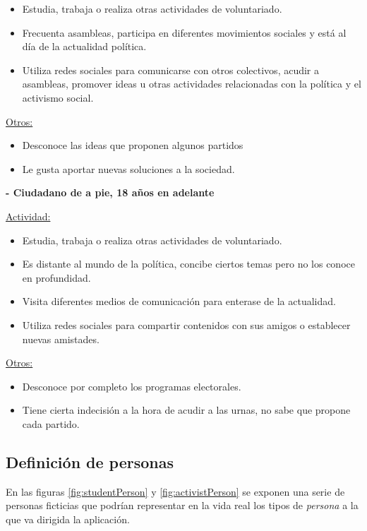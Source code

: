 \begin{itemize}
\item Estudia, trabaja o realiza otras actividades de voluntariado.
\item Frecuenta asambleas, participa en diferentes movimientos sociales y está al día de la actualidad política.
\item Utiliza redes sociales para comunicarse con otros colectivos, acudir a asambleas, promover ideas u otras actividades relacionadas con la política y el activismo social.
\end{itemize}

\underline{Otros:}

\begin{itemize}
\item Desconoce las ideas que proponen algunos partidos 
\item Le gusta aportar nuevas soluciones a la sociedad.
\end{itemize}

\textbf{- Ciudadano de a pie, 18 años en adelante}

\underline{Actividad:}

\begin{itemize}
\item Estudia, trabaja o realiza otras actividades de voluntariado.
\item Es distante al mundo de la política, concibe ciertos temas pero no los conoce en profundidad.
\item Visita diferentes medios de comunicación para enterase de la actualidad.
\item Utiliza redes sociales para compartir contenidos con sus amigos o establecer nuevas amistades.
\end{itemize}

\underline{Otros:}

\begin{itemize}
\item Desconoce por completo los programas electorales. 
\item Tiene cierta indecisión a la hora de acudir a las urnas, no sabe que propone cada partido.
\end{itemize}

\subsection{Definición de personas}

En las figuras \ref{fig:studentPerson} y \ref{fig:activistPerson} se exponen una serie de personas ficticias que podrían representar en la vida real los tipos de \textit{persona} a la que va dirigida la aplicación.

